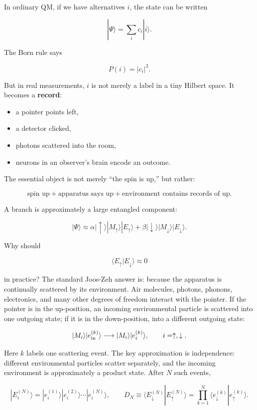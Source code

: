 \documentclass[11pt,a4paper]{article}
\begin{document}
In ordinary QM, if we have alternatives $i$, the state can be written

\[
|\Psi\rangle = \sum_i c_i |i\rangle.
\]

The Born rule says

\[
P(i)=|c_i|^2.
\]

But in real measurements, $i$ is not merely a label in a tiny Hilbert space. It becomes a \textbf{record}:

\begin{itemize}
  \item a pointer points left,
  \item a detector clicked,
  \item photons scattered into the room,
  \item neurons in an observer’s brain encode an outcome.
\end{itemize}

The essential object is not merely “the spin is up,” but rather:

\[
\text{spin up} + \text{apparatus says up} + \text{environment contains records of up}.
\]

A branch is approximately a large entangled component:

\[
|\Psi\rangle
\approx
\alpha |\uparrow\rangle |M_\uparrow\rangle |E_\uparrow\rangle
+
\beta |\downarrow\rangle |M_\downarrow\rangle |E_\downarrow\rangle.
\]

Why should

\[
\langle E_\uparrow | E_\downarrow\rangle \approx 0
\]

in practice? The standard Joos-Zeh answer is: because the apparatus is continually scattered by its environment. Air molecules, photons, phonons, electronics, and many other degrees of freedom interact with the pointer. If the pointer is in the up-position, an incoming environmental particle is scattered into one outgoing state; if it is in the down-position, into a different outgoing state:

\[
|M_i\rangle |e^{(k)}_{\rm in}\rangle \longrightarrow |M_i\rangle |e^{(k)}_i\rangle,
\qquad i=\uparrow,\downarrow.
\]

Here $k$ labels one scattering event. The key approximation is independence: different environmental particles scatter separately, and the incoming environment is approximately a product state. After $N$ such events,

\[
|E_i^{(N)}\rangle = |e_i^{(1)}\rangle |e_i^{(2)}\rangle \cdots |e_i^{(N)}\rangle,
\qquad
D_N \equiv \langle E_\downarrow^{(N)} | E_\uparrow^{(N)}\rangle = \prod_{k=1}^N \langle e_\downarrow^{(k)} | e_\uparrow^{(k)}\rangle.
\]
\end{document}
